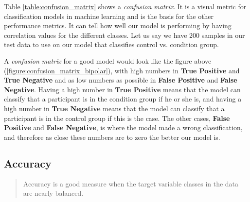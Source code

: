 
Table \ref{table:confusion_matrix} shows a \textit{confusion matrix}. It is a visual metric for classification models in machine learning and is the basis for the other performance metrics. It can tell how well our model is performing by having correlation values for the different classes. Let us say we have 200 samples in our test data to use on our model that classifies control vs. condition group. 

A \textit{confusion matrix} for a good model would look like the figure above (\ref{figure:confusion_matrix_bipolar}), with high numbers in \textbf{True Positive} and \textbf{True Negative} and as low numbers as possible in \textbf{False Positive} and \textbf{False Negative}. Having a high number in \textbf{True Positive} means that the model can classify that a participant is in the condition group if he or she is, and having a high number in \textbf{True Negative} means that the model can classify that a participant is in the control group if this is the case. The other cases, \textbf{False Positive} and \textbf{False Negative}, is where the model made a wrong classification, and therefore as close these numbers are to zero the better our model is.

\subsection{Accuracy}

\blockquote[\cite{ml_metrics}]{Accuracy is a good measure when the target variable classes in the data are nearly balanced.}

